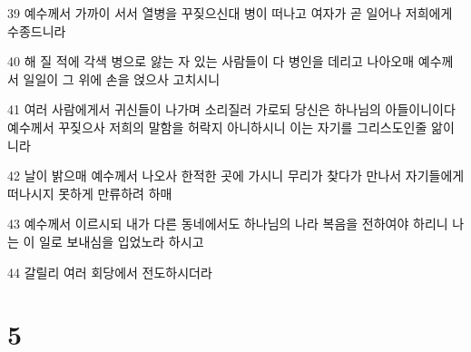 \par 39 예수께서 가까이 서서 열병을 꾸짖으신대 병이 떠나고 여자가 곧 일어나 저희에게 수종드니라
\par 40 해 질 적에 각색 병으로 앓는 자 있는 사람들이 다 병인을 데리고 나아오매 예수께서 일일이 그 위에 손을 얹으사 고치시니
\par 41 여러 사람에게서 귀신들이 나가며 소리질러 가로되 당신은 하나님의 아들이니이다 예수께서 꾸짖으사 저희의 말함을 허락지 아니하시니 이는 자기를 그리스도인줄 앎이니라
\par 42 날이 밝으매 예수께서 나오사 한적한 곳에 가시니 무리가 찾다가 만나서 자기들에게 떠나시지 못하게 만류하려 하매
\par 43 예수께서 이르시되 내가 다른 동네에서도 하나님의 나라 복음을 전하여야 하리니 나는 이 일로 보내심을 입었노라 하시고
\par 44 갈릴리 여러 회당에서 전도하시더라

\chapter{5}

